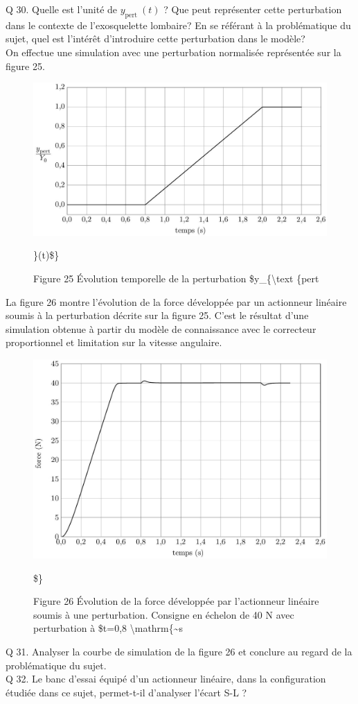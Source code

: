 \documentclass[10pt]{article}
\begin{document}
Q 30. Quelle est l'unité de $y_{\text {pert }}(t)$ ? Que peut représenter cette perturbation dans le contexte de l'exosquelette lombaire? En se référant à la problématique du sujet, quel est l'intérêt d'introduire cette perturbation dans le modèle?\\
On effectue une simulation avec une perturbation normalisée représentée sur la figure 25.

\begin{figure}[h]
\begin{center}
  \includegraphics[width=\textwidth]{2025_09_16_5f2d7643f7e649c6833dg-17}
\captionsetup{labelformat=empty}
\caption{Figure 25 Évolution temporelle de la perturbation \$y\_\{\textbackslash text \{pert }\}(t)\$\}\end{center}
\end{figure}

La figure 26 montre l'évolution de la force développée par un actionneur linéaire soumis à la perturbation décrite sur la figure 25. C'est le résultat d'une simulation obtenue à partir du modèle de connaissance avec le correcteur proportionnel et limitation sur la vitesse angulaire.

\begin{figure}[h]
\begin{center}
  \includegraphics[width=\textwidth]{2025_09_16_5f2d7643f7e649c6833dg-17(1)}
\captionsetup{labelformat=empty}
\caption{Figure 26 Évolution de la force développée par l'actionneur linéaire soumis à une perturbation. Consigne en échelon de 40 N avec perturbation à \$t=0,8 \textbackslash mathrm\{\~{}s}\$\}\end{center}
\end{figure}

Q 31. Analyser la courbe de simulation de la figure 26 et conclure au regard de la problématique du sujet.\\
Q 32. Le banc d'essai équipé d'un actionneur linéaire, dans la configuration étudiée dans ce sujet, permet-t-il d'analyser l'écart S-L ?
\end{document}
